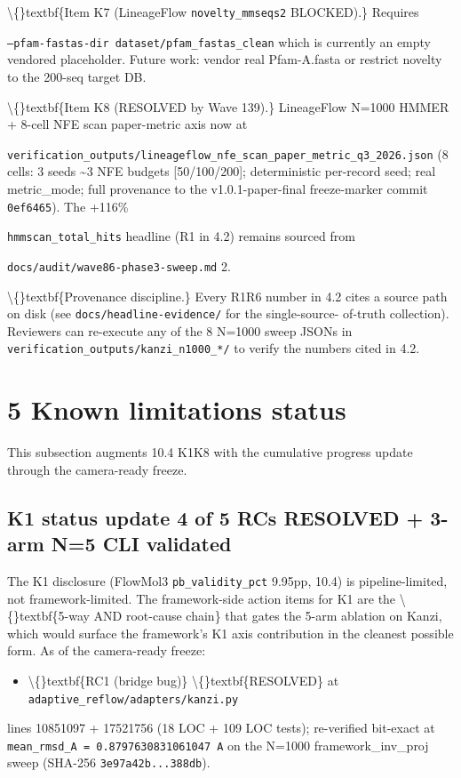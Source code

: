 \documentclass[preprint,3p,times,twocolumn]{elsarticle}
\begin{document}
\textbackslash\{\}textbf\{Item K7 (LineageFlow \texttt{novelty\_mmseqs2} BLOCKED).\} Requires

\texttt{--pfam-fastas-dir dataset/pfam\_fastas\_clean} which is currently an empty vendored placeholder. Future work: vendor real Pfam-A.fasta or restrict novelty to the 200-seq target DB.

\textbackslash\{\}textbf\{Item K8 (RESOLVED by Wave 139).\} LineageFlow N=1000 HMMER + 8-cell NFE scan paper-metric axis now at

\texttt{verification\_outputs/lineageflow\_nfe\_scan\_paper\_metric\_q3\_2026.json} (8 cells: 3 seeds  \textasciitilde{}3 NFE budgets [50/100/200]; deterministic per-record seed; real metric\_mode; full provenance to the v1.0.1-paper-final freeze-marker commit \texttt{0ef6465}). The +116\%

\texttt{hmmscan\_total\_hits} headline (R1 in 4.2) remains sourced from

\texttt{docs/audit/wave86-phase3-sweep.md} 2.

\textbackslash\{\}textbf\{Provenance discipline.\} Every R1R6 number in 4.2 cites a source path on disk (see \texttt{docs/headline-evidence/} for the single-source- of-truth collection). Reviewers can re-execute any of the 8 N=1000 sweep JSONs in \texttt{verification\_outputs/kanzi\_n1000\_*/} to verify the numbers cited in 4.2.

\section{5 Known limitations status}
This subsection augments 10.4 K1K8 with the cumulative progress update through the camera-ready freeze.

\subsection{K1 status update  4 of 5 RCs RESOLVED + 3-arm N=5 CLI validated}
The K1 disclosure (FlowMol3 \texttt{pb\_validity\_pct} 9.95pp, 10.4) is pipeline-limited, not framework-limited. The framework-side action items for K1 are the \textbackslash\{\}textbf\{5-way AND root-cause chain\} that gates the 5-arm ablation on Kanzi, which would surface the framework's K1 axis contribution in the cleanest possible form. As of the camera-ready freeze:

\begin{itemize}
\item \textbackslash\{\}textbf\{RC1 (bridge bug)\}  \textbackslash\{\}textbf\{RESOLVED\} at \texttt{adaptive\_reflow/adapters/kanzi.py}
\end{itemize}
lines 10851097 + 17521756 (18 LOC + 109 LOC tests); re-verified bit-exact at \texttt{mean\_rmsd\_A = 0.8797630831061047 A} on the N=1000 framework\_inv\_proj sweep (SHA-256 \texttt{3e97a42b...388db}).
\end{document}
